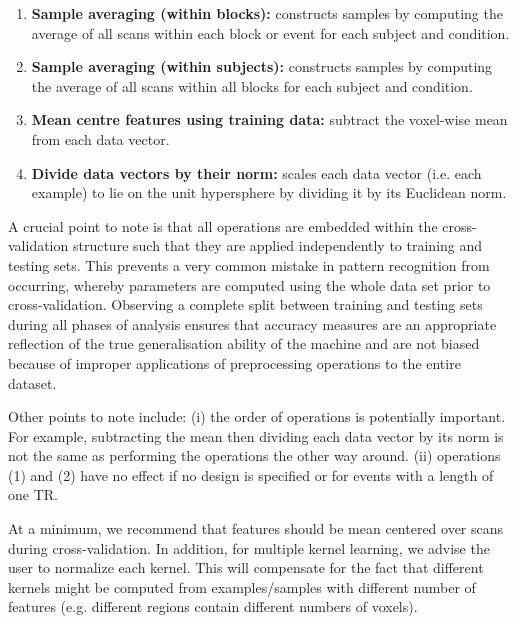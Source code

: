 \begin{enumerate}
\item \textbf{Sample averaging (within blocks):} constructs samples by computing the average of all scans within each block or event for each subject and condition. 
\item \textbf{Sample averaging (within subjects):} constructs samples by computing the average of all scans within all blocks for each subject and condition.
\item \textbf{Mean centre features using training data:} subtract the voxel-wise mean from each data vector.
\item \textbf{Divide data vectors by their norm:} scales each data vector (i.e. each example) to lie on the unit hypersphere by dividing it by its Euclidean norm.
\end{enumerate}


A crucial point to note is that all operations are embedded within the cross-validation structure such that they are applied independently to training and testing sets. This prevents a very common mistake in pattern recognition from occurring, whereby parameters are computed using the whole data set prior to cross-validation. Observing a complete split between training and testing sets during all phases of analysis ensures that accuracy measures are an appropriate reflection of the true generalisation ability of the machine and are not biased because of improper applications of preprocessing operations to the entire dataset.

Other points to note include: (i) the order of operations is potentially important. For example, subtracting the mean then dividing each data vector by its norm is not the same as performing the operations the other way around. (ii) operations (1) and (2) have no effect if no design is specified or for events with a length of one TR.

At a minimum, we recommend that features should be mean centered over scans during cross-validation. In addition, for multiple kernel learning, we advise the user to normalize each kernel. This will compensate for the fact that different kernels might be computed from examples/samples with different number of features (e.g. different regions contain different numbers of voxels).

